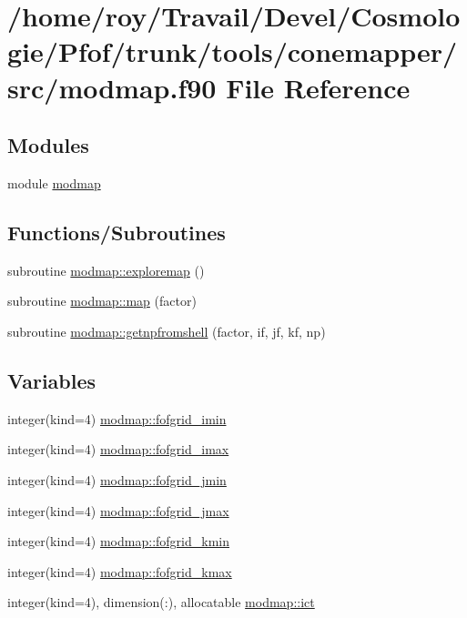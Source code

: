 \hypertarget{modmap_8f90}{}\section{/home/roy/\+Travail/\+Devel/\+Cosmologie/\+Pfof/trunk/tools/conemapper/src/modmap.f90 File Reference}
\label{modmap_8f90}
\subsection*{Modules}
\begin{DoxyCompactItemize}
\item 
module \hyperlink{namespacemodmap}{modmap}
\end{DoxyCompactItemize}
\subsection*{Functions/\+Subroutines}
\begin{DoxyCompactItemize}
\item 
subroutine \hyperlink{namespacemodmap_a4dabe74fe33947e22abfde9897dff20b}{modmap\+::exploremap} ()
\item 
subroutine \hyperlink{namespacemodmap_af6328324bc6aaca47018ded5f4c8e8cb}{modmap\+::map} (factor)
\item 
subroutine \hyperlink{namespacemodmap_a61603fa7aecee06e2efaa0c647e35df6}{modmap\+::getnpfromshell} (factor, if, jf, kf, np)
\end{DoxyCompactItemize}
\subsection*{Variables}
\begin{DoxyCompactItemize}
\item 
integer(kind=4) \hyperlink{namespacemodmap_a4c96661037ebd0e043cf2967b7e94067}{modmap\+::fofgrid\+\_\+imin}
\item 
integer(kind=4) \hyperlink{namespacemodmap_adf255364fd93d9af29d1f179bf50f5ba}{modmap\+::fofgrid\+\_\+imax}
\item 
integer(kind=4) \hyperlink{namespacemodmap_ac44fd964c6a2812634e903df91c5bcb6}{modmap\+::fofgrid\+\_\+jmin}
\item 
integer(kind=4) \hyperlink{namespacemodmap_a1644332b29d20583060c9316d8cd2fa1}{modmap\+::fofgrid\+\_\+jmax}
\item 
integer(kind=4) \hyperlink{namespacemodmap_ac4f40bdda34481044d92691776976abc}{modmap\+::fofgrid\+\_\+kmin}
\item 
integer(kind=4) \hyperlink{namespacemodmap_a7273a00ef7481fa382b6016d39a752e3}{modmap\+::fofgrid\+\_\+kmax}
\item 
integer(kind=4), dimension(\+:), allocatable \hyperlink{namespacemodmap_af68652ecce879493f3a84180017cccbd}{modmap\+::ict}
\end{DoxyCompactItemize}
